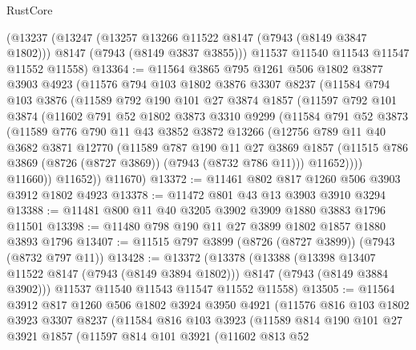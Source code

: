\begin{lexlean}{RustCore}
\begin{coremodule}
    (@13237
      (@13247
        (@13257 @13266 @11522 @8147 (@7943 (@8149 @3847 @1802)))
        @8147
        (@7943 (@8149 @3837 @3855)))
      @11537
      @11540
      @11543
      @11547
      @11552
      @11558)
@13364 := @11564
    @3865
    @795
    @1261
    @506
    @1802
    @3877
    @3903
    @4923
    (@11576
      @794
      @103
      @1802
      @3876
      @3307
      @8237
      (@11584
        @794
        @103
        @3876
        (@11589
          @792
          @190
          @101
          @27
          @3874
          @1857
          (@11597
            @792
            @101
            @3874
            (@11602
              @791
              @52
              @1802
              @3873
              @3310
              @9299
              (@11584
                @791
                @52
                @3873
                (@11589
                  @776
                  @790
                  @11
                  @43
                  @3852
                  @3872
                  @13266
                  (@12756
                    @789
                    @11
                    @40
                    @3682
                    @3871
                    @12770
                    (@11589
                      @787
                      @190
                      @11
                      @27
                      @3869
                      @1857
                      (@11515 @786 @3869 (@8726 (@8727 @3869)) (@7943 (@8732 @786 @11)))
                      @11652))))
              @11660))
          @11652))
      @11670)
@13372 := @11461 @802 @817 @1260 @506 @3903 @3912 @1802 @4923
@13378 := @11472 @801 @43 @13 @3903 @3910 @3294
@13388 := @11481 @800 @11 @40 @3205 @3902 @3909 @1880 @3883 @1796 @11501
@13398 := @11480 @798 @190 @11 @27 @3899 @1802 @1857 @1880 @3893 @1796
@13407 := @11515 @797 @3899 (@8726 (@8727 @3899)) (@7943 (@8732 @797 @11))
@13428 := @13372
    (@13378
      (@13388
        (@13398 @13407 @11522 @8147 (@7943 (@8149 @3894 @1802)))
        @8147
        (@7943 (@8149 @3884 @3902)))
      @11537
      @11540
      @11543
      @11547
      @11552
      @11558)
@13505 := @11564
    @3912
    @817
    @1260
    @506
    @1802
    @3924
    @3950
    @4921
    (@11576
      @816
      @103
      @1802
      @3923
      @3307
      @8237
      (@11584
        @816
        @103
        @3923
        (@11589
          @814
          @190
          @101
          @27
          @3921
          @1857
          (@11597
            @814
            @101
            @3921
            (@11602
              @813
              @52

\end{coremodule}
\end{lexlean}
